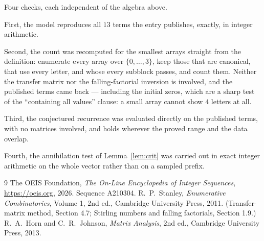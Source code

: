 \documentclass[11pt,a4paper]{article}
\theoremstyle{plain}
\theoremstyle{definition}
\begin{document}
Four checks, each independent of the algebra above.

First, the model reproduces all $13$ terms the entry publishes, exactly, in integer
arithmetic.

Second, the count was recomputed for the smallest arrays straight from the definition:
enumerate every array over $\{0,\dots,3\}$, keep those that are canonical, that use every
letter, and whose every subblock passes, and count them. Neither the transfer matrix nor the
falling-factorial inversion is involved, and the published terms came back --- including the
initial zeros, which are a sharp test of the ``containing all values'' clause: a small array
cannot show $4$ letters at all.

Third, the conjectured recurrence was evaluated directly on the published terms, with no
matrices involved, and holds wherever the proved range and the data overlap.

Fourth, the annihilation test of Lemma~\ref{lem:crit} was carried out in exact integer
arithmetic on the whole vector rather than on a sampled prefix.

\begin{thebibliography}{9}
 The OEIS Foundation, \emph{The On-Line Encyclopedia of Integer
Sequences}, \url{https://oeis.org}, 2026. Sequence A210304.
 R.~P.~Stanley, \emph{Enumerative Combinatorics}, Volume 1, 2nd ed.,
Cambridge University Press, 2011. (Transfer-matrix method, Section 4.7; Stirling numbers and
falling factorials, Section 1.9.)
 R.~A.~Horn and C.~R.~Johnson, \emph{Matrix Analysis}, 2nd ed., Cambridge
University Press, 2013.
\end{thebibliography}
\end{document}
